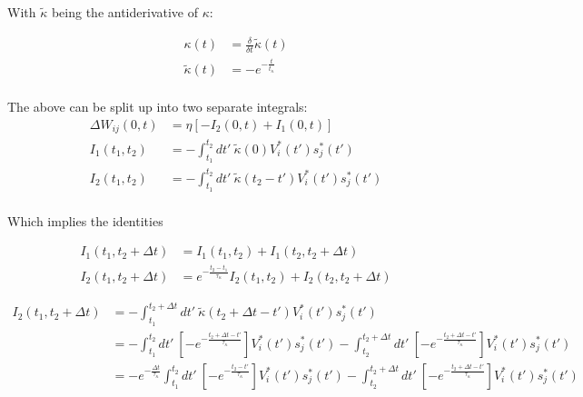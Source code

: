 With $\tilde{\kappa}$ being the antiderivative of $\kappa$:

\begin{align*}
  \kappa(t)         & = \frac{\delta}{\delta t} \tilde{\kappa}(t) \\
  \tilde{\kappa}(t) & = - e^{-\frac{t}{t_{\kappa}}}               \\
\end{align*}

The above can be split up into two separate integrals:
\begin{align*}
  \Delta W_{ij}(0,t) & =\eta \left[ -I_2 (0, t) + I_1(0,t) \right]                                      \\
  I_1(t_1, t_2)      & = - \int_{t_1}^{t_2} dt' \ \tilde{\kappa} (0) V_i^\ast (t') s_j^\ast (t')        \\
  I_2(t_1, t_2)      & = - \int_{t_1}^{t_2} dt' \ \tilde{\kappa} (t_2 - t') V_i^\ast (t') s_j^\ast (t') \\
\end{align*}

Which implies the identities

\begin{align*}
  I_1(t_1, t_2 + \Delta t) & = I_1 (t_1, t_2) + I_1 (t_2, t_2 + \Delta t)                                       \\
  I_2(t_1, t_2 + \Delta t) & = e^{- \frac{t_2 - t_1}{\tau_{\kappa}}} I_2 (t_1, t_2) + I_2 (t_2, t_2 + \Delta t)
\end{align*}


\begin{align}
  I_2 (t_1, t_2 + \Delta t) & = -\int_{t_1}^{t_2 + \Delta t} dt' \ \tilde{\kappa} (t_2 + \Delta t - t') V_i^\ast (t') s_j^\ast (t')                                        \\
                            & = -\int_{t_1}^{t_2} dt' \ \left[ -e^{- \frac{t_2 + \Delta t - t'}{\tau_\kappa}} \right] V_i^\ast (t') s_j^\ast (t')
  -\int_{t_2}^{t_2 + \Delta t} dt' \ \left[ -e^{- \frac{t_2 + \Delta t - t'}{\tau_\kappa}} \right] V_i^\ast (t') s_j^\ast (t')                                             \\
                            & = -e^{- \frac{ \Delta t}{\tau_\kappa}} \int_{t_1}^{t_2} dt' \ \left[ -e^{- \frac{t_2 - t'}{\tau_\kappa}} \right] V_i^\ast (t') s_j^\ast (t')
  -\int_{t_2}^{t_2 + \Delta t} dt' \ \left[ -e^{- \frac{t_2 + \Delta t - t'}{\tau_\kappa}} \right] V_i^\ast (t') s_j^\ast (t')
\end{align}


